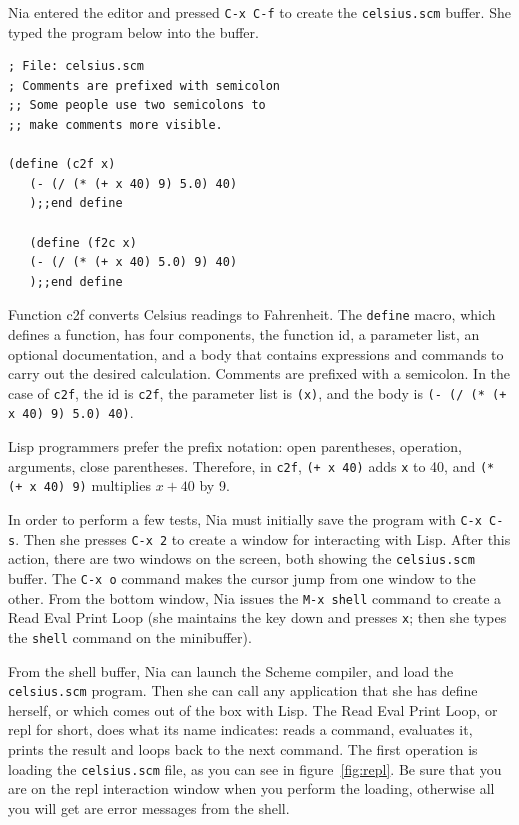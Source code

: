 \documentclass[a4paper,12pt]{book}
\begin{document}
Nia entered the editor and pressed \verb|C-x C-f| 
to create the \verb|celsius.scm| buffer. 
She typed the  program below into the buffer. 
\begin{verbatim}
; File: celsius.scm
; Comments are prefixed with semicolon
;; Some people use two semicolons to
;; make comments more visible.

(define (c2f x)
   (- (/ (* (+ x 40) 9) 5.0) 40)
   );;end define

   (define (f2c x)
   (- (/ (* (+ x 40) 5.0) 9) 40)
   );;end define
\end{verbatim}
Function c2f converts Celsius readings to Fahrenheit.
The \verb|define| macro, which defines a function, 
has four components, the function id, a parameter list,
an optional documentation, and a body that contains
expressions and commands to carry out the desired
calculation. Comments are prefixed with a semicolon.
In the case of \verb|c2f|, the id is \verb|c2f|,
the parameter list is \verb|(x)|, and the body 
is \verb|(- (/ (* (+ x 40) 9) 5.0) 40)|.

Lisp programmers prefer the prefix notation:
open parentheses, operation, arguments, close parentheses.
Therefore, in  \verb|c2f|,  \verb|(+ x 40)|
adds \verb|x| to 40, and \verb|(* (+ x 40) 9)| multiplies $x+40$ by 9.

In order to perform a few tests, Nia must initially save
the program with \verb|C-x C-s|. Then she 
presses \verb|C-x 2| to create a window for interacting
with Lisp. After this action, there are two
windows on the screen, both 
showing the \verb|celsius.scm| buffer. The \verb|C-x o| command
makes the cursor jump from one window to the other.
From the bottom window, Nia issues the  \verb|M-x shell| command
to create a Read Eval Print Loop (she maintains the
 key down and presses \verb|x|; then she types
the \verb|shell| command on the minibuffer). 

From the shell buffer, Nia can launch the Scheme compiler,
and load the \verb|celsius.scm| program. Then she can
call any application that she has define herself, or which
comes out of the box with Lisp. The Read Eval Print Loop,
or repl for short, does what its name indicates: reads a
command, evaluates it, prints the result and loops back
to the next command. The first operation is loading the
\verb|celsius.scm| file, as you can see in
figure~\ref{fig:repl}. Be sure that you are on the repl
interaction window when you perform the loading, otherwise
all you will get are error messages from the shell.
\end{document}
